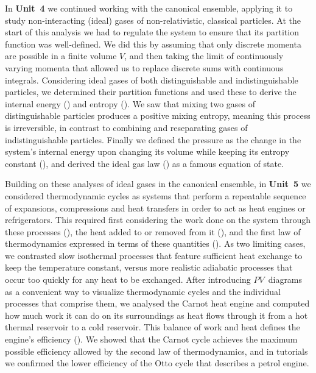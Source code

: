 In \textbf{Unit~4} we continued working with the canonical ensemble, applying it to study non-interacting (ideal) gases of non-relativistic, classical particles.
At the start of this analysis we had to regulate the system to ensure that its partition function was well-defined.
We did this by assuming that only discrete momenta are possible in a finite volume $V$, and then taking the limit of continuously varying momenta that allowed us to replace discrete sums with continuous integrals.
Considering ideal gases of both distinguishable and indistinguishable particles, we determined their partition functions and used these to derive the internal energy () and entropy ().
We saw that mixing two gases of distinguishable particles produces a positive mixing entropy, meaning this process is irreversible, in contrast to combining and reseparating gases of indistinguishable particles.
Finally we defined the pressure as the change in the system's internal energy upon changing its volume while keeping its entropy constant (), and derived the ideal gas law () as a famous equation of state.

Building on these analyses of ideal gases in the canonical ensemble, in \textbf{Unit~5} we considered thermodynamic cycles as systems that perform a repeatable sequence of expansions, compressions and heat transfers in order to act as heat engines or refrigerators.
This required first considering the work done on the system through these processes (), the heat added to or removed from it (), and the first law of thermodynamics expressed in terms of these quantities ().
As two limiting cases, we contrasted slow isothermal processes that feature sufficient heat exchange to keep the temperature constant, versus more realistic adiabatic processes that occur too quickly for any heat to be exchanged.
After introducing $PV$~diagrams as a convenient way to visualize thermodynamic cycles and the individual processes that comprise them, we analysed the Carnot heat engine and computed how much work it can do on its surroundings as heat flows through it from a hot thermal reservoir to a cold reservoir.
This balance of work and heat defines the engine's efficiency ().
We showed that the Carnot cycle achieves the maximum possible efficiency allowed by the second law of thermodynamics, and in tutorials we confirmed the lower efficiency of the Otto cycle that describes a petrol engine.

